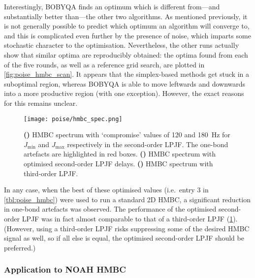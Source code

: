 Interestingly, BOBYQA finds an optimum which is different from---and substantially better than---the other two algorithms.
As mentioned previously, it is not generally possible to predict which optimum an algorithm will converge to, and this is complicated even further by the presence of noise, which imparts some stochastic character to the optimisation.
Nevertheless, the other runs actually show that similar optima are reproducibly obtained: the optima found from each of the five rounds, as well as a reference grid search, are plotted in \cref{fig:poise_hmbc_scan}.
It appears that the simplex-based methods get stuck in a suboptimal region, whereas BOBYQA is able to move leftwards and downwards into a more productive region (with one exception).
However, the exact reasons for this remains unclear.

\begin{figure}[htb]
    \centering
    \texttt{[image: poise/hmbc\_spec.png]}
    {\label{fig:poise_hmbc_spec_unopt2}}
    {\label{fig:poise_hmbc_spec_opt2}}
    {\label{fig:poise_hmbc_spec_3}}
    \caption[Comparison of HMBC spectra before and after POISE optimisation]{
        \textbf{()} HMBC spectrum with `compromise' values of 120 and \SI{180}{\Hz} for $J_\text{min}$ and $J_\text{max}$ respectively in the second-order LPJF.
        The one-bond artefacts are highlighted in red boxes.
        \textbf{()} HMBC spectrum with optimised second-order LPJF delays.
        \textbf{()} HMBC spectrum with third-order LPJF.
    }
    \label{fig:poise_hmbc_spec}
\end{figure}

In any case, when the best of these optimised values (i.e.\ entry 3 in \cref{tbl:poise_hmbc}) were used to run a standard 2D HMBC, a significant reduction in one-bond artefacts was observed.
The performance of the optimised second-order LPJF was in fact almost comparable to that of a third-order LPJF (\cref{fig:poise_hmbc_spec}).
(However, using a third-order LPJF risks suppressing some of the desired HMBC signal as well, so if all else is equal, the optimised second-order LPJF should be preferred.)


\subsubsection{Application to NOAH HMBC}

